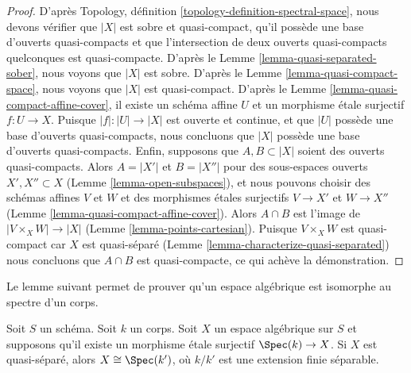 \begin{proof}
D'après Topology, définition \ref{topology-definition-spectral-space},
nous devons vérifier que $|X|$ est sobre et quasi-compact, qu'il possède une base
d'ouverts quasi-compacts et que l'intersection de deux
ouverts quasi-compacts quelconques est quasi-compacte. D'après le
Lemme \ref{lemma-quasi-separated-sober}, nous voyons que $|X|$ est sobre.
D'après le Lemme \ref{lemma-quasi-compact-space}, nous voyons que $|X|$ est quasi-compact.
D'après le Lemme \ref{lemma-quasi-compact-affine-cover}, il existe un schéma affine
$U$ et un morphisme \'etale surjectif $f : U \to X$.
Puisque $|f| : |U| \to |X|$ est ouverte et continue, et que $|U|$ possède
une base d'ouverts quasi-compacts, nous concluons que $|X|$ possède une base
d'ouverts quasi-compacts. Enfin, supposons que
$A, B \subset |X|$ soient des ouverts quasi-compacts. Alors $A = |X'|$ et $B = |X''|$
pour des sous-espaces ouverts $X', X'' \subset X$ (Lemme \ref{lemma-open-subspaces}),
et nous pouvons choisir des schémas affines $V$ et $W$ et des morphismes
\'etales surjectifs $V \to X'$ et $W \to X''$
(Lemme \ref{lemma-quasi-compact-affine-cover}).
Alors $A \cap B$ est l'image de
$|V \times_X W| \to |X|$ (Lemme \ref{lemma-points-cartesian}).
Puisque $V \times_X W$ est quasi-compact car $X$ est quasi-séparé
(Lemme \ref{lemma-characterize-quasi-separated})
nous concluons que $A \cap B$ est quasi-compacte, ce qui achève la démonstration.
\end{proof}

\noindent
Le lemme suivant permet de prouver qu'un
espace algébrique est isomorphe au spectre d'un corps.

\begin{lemma}
\label{lemma-point-like-spaces}
Soit $S$ un schéma. Soit $k$ un corps.
Soit $X$ un espace algébrique sur $S$ et supposons qu'il existe
un morphisme \'etale surjectif $\Spec(k) \to X$.
Si $X$ est quasi-séparé, alors $X \cong \Spec(k')$,
où $k/k'$ est une extension finie séparable.
\end{lemma}

